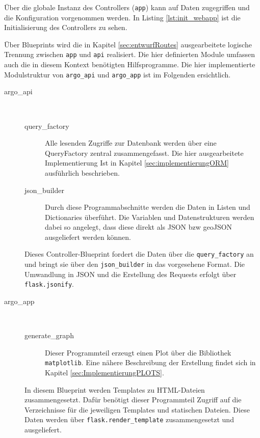 

Über die globale Instanz des Controllers (\texttt{app}) kann auf Daten zugegriffen und die Konfiguration vorgenommen werden. In Listing \ref{lst:init_webapp} ist die Initialisierung des Controllers zu sehen.

Über Blueprints wird die in Kapitel \ref{sec:entwurfRoutes} ausgearbeitete logische Trennung zwischen \texttt{app} und \texttt{api} realisiert. Die hier definierten Module umfassen auch die in diesem Kontext benötigten Hilfsprogramme. Die hier implementierte Modulstruktur von \texttt{argo\_api} und \texttt{argo\_app} ist im Folgenden ersichtlich.

\begin{description}
 \item [argo\_api] $ $
     
    \begin{description}
     \item [query\_factory] 
        Alle lesenden Zugriffe zur Datenbank werden über eine QueryFactory zentral zusammengefasst. Die hier ausgearbeitete Implementierung Ist in Kapitel \ref{sec:implementierungORM} ausführlich beschrieben.
         
     \item [json\_builder] 
        Durch diese Programmabschnitte werden die Daten in Listen und Dictionaries überführt. Die Variablen und Datenstrukturen werden dabei so angelegt, dass diese direkt als JSON bzw geoJSON ausgeliefert werden können. 
    \end{description}
    
    Dieses Controller-Blueprint fordert die Daten über die \texttt{query\_factory} an und bringt sie über den \texttt{json\_builder} in das vorgesehene Format.  Die Umwandlung in JSON und die Erstellung des Requests erfolgt über \texttt{flask.jsonify}.
\pagebreak
 \item [argo\_app] $ $
 
    \begin{description}
     \item [generate\_graph] Dieser Programmteil erzeugt einen Plot über die Bibliothek \texttt{matplotlib}. Eine nähere Beschreibung der Erstellung findet sich in Kapitel \ref{sec:ImplementierungPLOTS}.
    \end{description}
    
    In diesem Blueprint werden Templates zu HTML-Dateien zusammengesetzt. Dafür benötigt dieser Programmteil Zugriff auf die Verzeichnisse für die jeweiligen Templates und statischen Dateien. Diese Daten werden über \texttt{flask.render\_template} zusammengesetzt und ausgeliefert.
\end{description}

